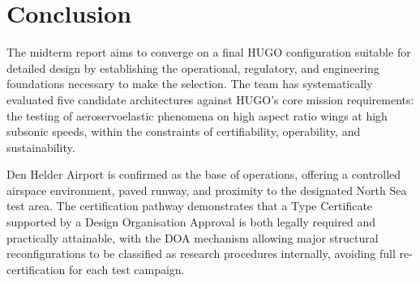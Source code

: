 \chapter{Conclusion}

The midterm report aims to converge on a final HUGO configuration suitable for detailed design by establishing the operational, regulatory, and engineering foundations necessary to make the selection. The team has systematically evaluated five candidate architectures against HUGO's core mission requirements: the testing of aeroservoelastic phenomena on high aspect ratio wings at high subsonic speeds, within the constraints of certifiability, operability, and sustainability.

Den Helder Airport is confirmed as the base of operations, offering a controlled airspace environment, paved runway, and proximity to the designated North Sea test area. The certification pathway demonstrates that a Type Certificate supported by a Design Organisation Approval is both legally required and practically attainable, with the DOA mechanism allowing major structural reconfigurations to be classified as research procedures internally, avoiding full re-certification for each test campaign.

